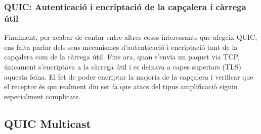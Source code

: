 \subsubsection{QUIC: Autenticació i encriptació de la capçalera i càrrega útil}
{
    Finalment, per acabar de contar entre altres coses interessants que afegeix QUIC, ens falta parlar dels seus mecanismes d'autenticació i encriptació tant de
    la capçalera com de la càrrega útil. Fins ara, quan s'envia un paquet via TCP, únicament s'encriptava a la càrrega útil i es deixava a capes superiors (TLS)
    aquesta feina. El fet de poder encriptar la majoria de la capçalera i verificar que el receptor és qui realment diu ser fa que atacs del tipus amplificació siguin
    especialment complicats.
}

\subsection{QUIC Multicast}
